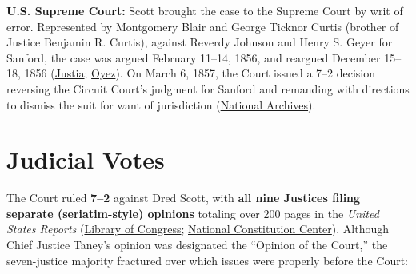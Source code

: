 \documentclass[12pt]{article}
\begin{document}
\textbf{U.S. Supreme Court:} Scott brought the case to the Supreme Court by writ of error. Represented by Montgomery Blair and George Ticknor Curtis (brother of Justice Benjamin R. Curtis), against Reverdy Johnson and Henry S. Geyer for Sanford, the case was argued February 11--14, 1856, and reargued December 15--18, 1856 (\href{https://supreme.justia.com/cases/federal/us/60/393/}{Justia}; \href{https://www.oyez.org/cases/1850-1900/60us393}{Oyez}). On March 6, 1857, the Court issued a 7--2 decision reversing the Circuit Court's judgment for Sanford and remanding with directions to dismiss the suit for want of jurisdiction (\href{https://www.archives.gov/milestone-documents/dred-scott-v-sandford}{National Archives}).

\section{Judicial Votes}

The Court ruled \textbf{7--2} against Dred Scott, with \textbf{all nine Justices filing separate (seriatim-style) opinions} totaling over 200 pages in the \textit{United States Reports} (\href{https://tile.loc.gov/storage-services/service/ll/usrep/usrep060/usrep060393a/usrep060393a.pdf}{Library of Congress}; \href{https://constitutioncenter.org/the-constitution/supreme-court-case-library/dred-scott-v-sandford}{National Constitution Center}). Although Chief Justice Taney's opinion was designated the ``Opinion of the Court,'' the seven-justice majority fractured over which issues were properly before the Court:
\end{document}
